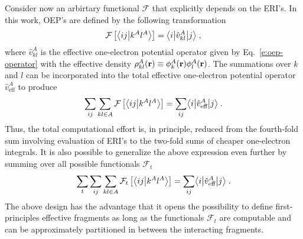 Consider now an arbirtary functional $\mathcal{F}$ that explicitly depends on the 
ERI's. In this work, OEP's are defined by the following transformation
%
 \begin{equation}
 \mathcal{F}
 \left[ 
   \bigl\langle {ij} \bigl\lvert {k^Al^A} \bigr\rangle
	 \right] = \bigl\langle {i} \bigl\lvert {\hat{v}_{kl}^A} \bigl\lvert {j} \bigr\rangle  \;,
 \end{equation}
%
where 
$\hat{v}_{kl}^A$ is the effective one-electron potential operator given by Eq.~\eqref{e:oep-operator} 
with the
effective density $\rho_{kl}^A({\bf r}) \equiv \phi_k^A({\bf r})\phi_l^A({\bf r})$.
The summations over $k$ and $l$ can be incorporated into the total effective one-electron potential operator
$\hat{v}_{\text{eff}}^A$
to produce
%
\begin{equation}
	\sum_{ij}\sum_{kl\in A} \mathcal{F}\left[ 
   \bigl\langle {ij} \bigl\lvert {k^Al^A} \bigr\rangle
 \right] = \sum_{ij} \bigl\langle {i} \bigl\lvert {\hat{v}_{\text{eff}}^A} \bigl\lvert {j} \bigr\rangle  \;.
\end{equation}
%
Thus, the total computational effort is, in principle, reduced from the fourth-fold
sum involving evaluation of ERI's to the two-fold sums of cheaper one-electron integrals.
It is also possible to generalize the above expression even further by
summing over all possible functionals ${\mathcal{F}}_t$
%
\begin{equation} \label{e:ft-reduction}
	\sum_t \sum_{ij}\sum_{kl\in A} {\mathcal{F}}_t\left[ 
   \bigl\langle {ij} \bigl\lvert {k^Al^A} \bigr\rangle
 \right] = \sum_{ij} \bigl\langle {i} \bigl\lvert {\hat{v}_{\text{eff}}^A} \bigl\lvert {j} \bigr\rangle \;.
\end{equation}
%
The above design has the advantage that it opens the possibility to define first\hyp{}principles
effective fragments as long as 
the functionals ${\mathcal{F}}_t$ 
are computable and can be approximately
partitioned in between the interacting fragments.

